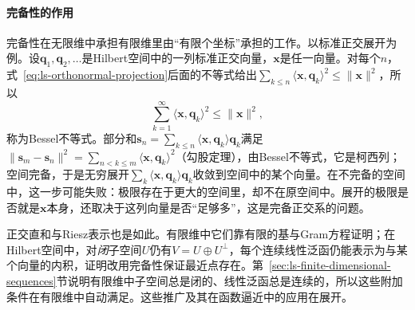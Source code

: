 \paragraph{完备性的作用}
完备性在无限维中承担有限维里由“有限个坐标”承担的工作。以标准正交展开为例。设$\bm q_1,\bm q_2,\ldots$是Hilbert空间中的一列标准正交向量，$\bm x$是任一向量。对每个$n$，式~\eqref{eq:ls-orthonormal-projection}后面的不等式给出$\sum_{k\leq n}\langle\bm x,\bm q_k\rangle^2\leq\lVert\bm x\rVert^2$，所以
\[
 \sum_{k=1}^\infty\langle\bm x,\bm q_k\rangle^2\leq\lVert\bm x\rVert^2 ,
\]
称为Bessel不等式。部分和$\bm s_n=\sum_{k\leq n}\langle\bm x,\bm q_k\rangle\bm q_k$满足$\lVert\bm s_m-\bm s_n\rVert^2=\sum_{n<k\leq m}\langle\bm x,\bm q_k\rangle^2$（勾股定理），由Bessel不等式，它是柯西列；空间完备，于是无穷展开$\sum_k\langle\bm x,\bm q_k\rangle\bm q_k$收敛到空间中的某个向量。在不完备的空间中，这一步可能失败：极限存在于更大的空间里，却不在原空间中。展开的极限是否就是$\bm x$本身，还取决于这列向量是否“足够多”，这是完备正交系的问题。

正交直和与Riesz表示也是如此。有限维中它们靠有限的基与Gram方程证明；在Hilbert空间中，对\emph{闭}子空间$U$仍有$V=U\oplus U^\perp$，每个连续线性泛函仍能表示为与某个向量的内积，证明改用完备性保证最近点存在。第~\ref{sec:ls-finite-dimensional-sequences}节说明有限维中子空间总是闭的、线性泛函总是连续的，所以这些附加条件在有限维中自动满足。这些推广及其在函数逼近中的应用在展开。
